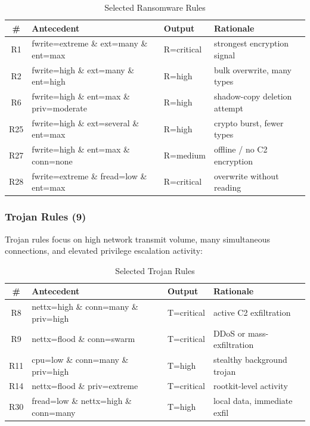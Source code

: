\documentclass[conference]{IEEEtran}
\begin{document}
\begin{table}[!t]
\centering
\caption{Selected Ransomware Rules}
\label{tab:ransom_rules}
\small\renewcommand{\arraystretch}{1.2}
\setlength{\tabcolsep}{5pt}
\begin{tabular}{@{} c p{6.0cm} l p{4.5cm} @{}}
\toprule
\textbf{\#} & \textbf{Antecedent} & \textbf{Output} & \textbf{Rationale} \\
\midrule
R1  & fwrite=extreme \& ext=many \& ent=max       & R=critical & strongest encryption signal \\
R2  & fwrite=high \& ext=many \& ent=high         & R=high     & bulk overwrite, many types  \\
R6  & fwrite=high \& ent=max \& priv=moderate     & R=high     & shadow-copy deletion attempt\\
R25 & fwrite=high \& ext=several \& ent=max       & R=high     & crypto burst, fewer types   \\
R27 & fwrite=high \& ent=max \& conn=none         & R=medium   & offline / no C2 encryption  \\
R28 & fwrite=extreme \& fread=low \& ent=max      & R=critical & overwrite without reading   \\
\bottomrule
\end{tabular}
\end{table}

\subsubsection{Trojan Rules (9)}

Trojan rules focus on high network transmit volume, many simultaneous
connections, and elevated privilege escalation activity:

\begin{table}[!t]
\centering
\caption{Selected Trojan Rules}
\label{tab:trojan_rules}
\small\renewcommand{\arraystretch}{1.2}
\setlength{\tabcolsep}{5pt}
\begin{tabular}{@{} c p{6.0cm} l p{4.5cm} @{}}
\toprule
\textbf{\#} & \textbf{Antecedent} & \textbf{Output} & \textbf{Rationale} \\
\midrule
R8  & nettx=high \& conn=many \& priv=high    & T=critical & active C2 exfiltration \\
R9  & nettx=flood \& conn=swarm               & T=critical & DDoS or mass-exfiltration \\
R11 & cpu=low \& conn=many \& priv=high       & T=high     & stealthy background trojan\\
R14 & nettx=flood \& priv=extreme             & T=critical & rootkit-level activity \\
R30 & fread=low \& nettx=high \& conn=many    & T=high     & local data, immediate exfil\\
\bottomrule
\end{tabular}
\end{table}
\end{document}

